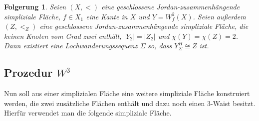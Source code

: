 \documentclass[12pt,titlepage,twoside,cleardoublepage]{article}
\theoremstyle{nummermitklammern}
\newtheorem{folgerung}[temp]{Folgerung}
\newtheorem{folgerung}[zahl]{Folgerung}
\numberwithin{equation}{section}
\begin{document}
\begin{folgerung}
Seien $(X,<)$ eine geschlossene Jordan-zusammenhängende simpliziale Fläche, $f\in X_1$ eine Kante in $X$ und $Y=W^2_f(X)$. Seien außerdem $(Z,<_Z)$ eine geschlossene Jordan-zusammenhängende simpliziale Fläche, die keinen Knoten vom Grad zwei enthält, $\vert Y_2\vert=\vert Z_2\vert$ und $\chi(Y)=\chi(Z)=2$. Dann existiert eine Lochwanderungssequenz $\Sigma$ so, dass $Y_{\Sigma}^H \cong Z$ ist.
\end{folgerung}

\subsection{Prozedur $W^3$}
Nun soll aus einer simplizialen Fläche eine weitere simpliziale Fläche konstruiert werden, die zwei zusätzliche Flächen enthält und dazu noch einen 3-Waist besitzt. Hierfür verwendet man die folgende simpliziale Fläche.
\end{document}
